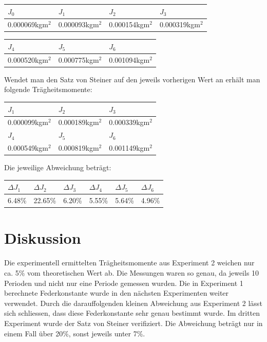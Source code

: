 \documentclass[12pt,a4paper]{article}
\begin{document}
\vspace{15pt}
\begin{tabular}{|l|l|l|l|}
\hline
$J_{0}$&$J_{1}$&$J_{2}$&$J_{3}$\\
\hline
0.000069kgm${}^2$&0.000093kgm${}^2$&0.000154kgm${}^2$&0.000319kgm${}^2$\\
\hline
\end{tabular}

\begin{tabular}{|l|l|l|}
\hline
$J_{4}$&$J_{5}$&$J_{6}$\\
\hline
0.000520kgm${}^2$&0.000775kgm${}^2$&0.001094kgm${}^2$\\
\hline
\end{tabular}

\vspace{15pt} \noindent
Wendet man den Satz von Steiner auf den jeweils vorherigen Wert an erh\"alt man folgende Tr\"agheitsmomente:

\vspace{15pt}
\begin{tabular}{|l|l|l|}
\hline
$J_{1}$&$J_{2}$&$J_{3}$\\
\hline
0.000099kgm${}^2$&0.000189kgm${}^2$&0.000339kgm${}^2$\\
\hline
\hline
$J_{4}$&$J_{5}$&$J_{6}$\\
\hline
0.000549kgm${}^2$&0.000819kgm${}^2$&0.001149kgm${}^2$\\
\hline
\end{tabular}

\vspace{15pt} \noindent
Die jeweilige Abweichung betr\"agt:

\vspace{15pt}
\begin{tabular}{|l|l|l|l|l|l|}
\hline
$\Delta J_{1}$&$\Delta J_{2}$&$\Delta J_{3}$&$\Delta J_{4}$&$\Delta J_{5}$&$\Delta J_{6}$\\
\hline
6.48\%&22.65\%&6.20\%&5.55\%&5.64\%&4.96\%\\
\hline
\end{tabular}

\section*{Diskussion}
Die experimentell ermittelten Tr\"agheitsmomente aus Experiment 2 weichen nur ca. 5\% vom theoretischen Wert ab. Die Messungen waren so genau, da jeweils 10 Perioden und nicht nur eine Periode gemessen wurden.
Die in Experiment 1 berechnete Federkonstante wurde in den n\"achsten Experimenten weiter verwendet. Durch die darauffolgenden kleinen Abweichung aus Experiment 2 l\"asst sich schliessen, dass diese Federkonstante sehr genau bestimmt wurde.
Im dritten Experiment wurde der Satz von Steiner verifiziert. Die Abweichung betr\"agt nur in einem Fall \"uber 20\%, sonst jeweils unter 7\%.
\end{document}
